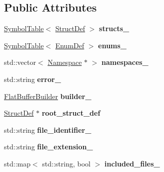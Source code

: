 \subsection*{Public Attributes}
\begin{DoxyCompactItemize}
\item 
\mbox{\label{classflatbuffers_1_1Parser_a8120a9e42b44549e86fe184bec319380}} 
\hyperlink{classflatbuffers_1_1SymbolTable}{Symbol\+Table}$<$ \hyperlink{structflatbuffers_1_1StructDef}{Struct\+Def} $>$ {\bfseries structs\+\_\+}
\item 
\mbox{\label{classflatbuffers_1_1Parser_a31253cf8895cd1b4173cc1e6dcf1b0cd}} 
\hyperlink{classflatbuffers_1_1SymbolTable}{Symbol\+Table}$<$ \hyperlink{structflatbuffers_1_1EnumDef}{Enum\+Def} $>$ {\bfseries enums\+\_\+}
\item 
\mbox{\label{classflatbuffers_1_1Parser_aee6a0068159d512ff846f5ad0eb511cd}} 
std\+::vector$<$ \hyperlink{structflatbuffers_1_1Namespace}{Namespace} $\ast$ $>$ {\bfseries namespaces\+\_\+}
\item 
\mbox{\label{classflatbuffers_1_1Parser_a0bea55c71a3820160ee28399963d65df}} 
std\+::string {\bfseries error\+\_\+}
\item 
\mbox{\label{classflatbuffers_1_1Parser_aa823d48f466d4f3fd6dd29e9ae6a9172}} 
\hyperlink{classflatbuffers_1_1FlatBufferBuilder}{Flat\+Buffer\+Builder} {\bfseries builder\+\_\+}
\item 
\mbox{\label{classflatbuffers_1_1Parser_a206153b9bef6ca4e798e9f60294dd1e7}} 
\hyperlink{structflatbuffers_1_1StructDef}{Struct\+Def} $\ast$ {\bfseries root\+\_\+struct\+\_\+def}
\item 
\mbox{\label{classflatbuffers_1_1Parser_a4fb465bb2374d67ec3bb46a4e4f2010b}} 
std\+::string {\bfseries file\+\_\+identifier\+\_\+}
\item 
\mbox{\label{classflatbuffers_1_1Parser_a89e12c7f751412786fd5aa8100465a53}} 
std\+::string {\bfseries file\+\_\+extension\+\_\+}
\item 
\mbox{\label{classflatbuffers_1_1Parser_a701b7827e5a1263c1189ceaa49dc0366}} 
std\+::map$<$ std\+::string, bool $>$ {\bfseries included\+\_\+files\+\_\+}
\end{DoxyCompactItemize}


